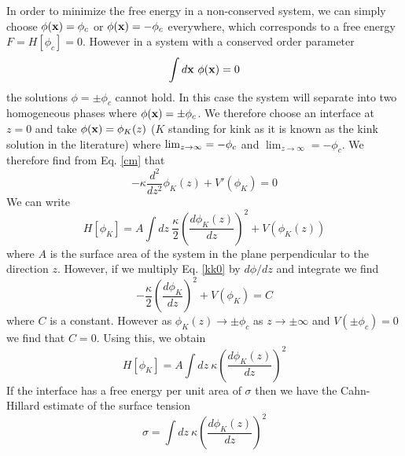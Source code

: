 In order to minimize the free energy in a non-conserved system, we can simply choose $\phi({\bf x}) =\phi_c$ or $\phi({\bf x}) =-\phi_c$ everywhere, which corresponds to a free energy $F=H[\phi_c]=0$. However in a system with a conserved order parameter
\begin{equation}
\int d{\bf x} \ \phi({\bf x})=0
\end{equation}
the solutions $\phi=\pm \phi_c$ cannot hold. In this case the system will separate into two homogeneous phases where $\phi({\bf x})= \pm \phi_c$. We therefore choose an interface at $z=0$ and take $\phi({\bf x}) = \phi_K(z)$ ($K$ standing for kink as it is known as the kink solution in the literature) where $\lim_{z\to\-\infty}=-\phi_c$ and $\lim_{z\to\infty}=-\phi_c$. 
We therefore find from Eq. \eqref{cm} that
\begin{equation}
-\kappa \frac{d^2 }{dz^2}\phi_K(z) + V'(\phi_K) = 0 
\label{kk0}
\end{equation}
We can write
\begin{equation}
H[\phi_K]= A\int dz \ \frac{\kappa}{2}\left(\frac{d\phi_K(z)}{dz}\right)^2 + V(\phi_K(z))
\label{kk1}
\end{equation}
where $A$ is the surface area of the system in the plane perpendicular to the direction $z$. 
However, if we multiply Eq. \eqref{kk0} by $d\phi/dz$ and integrate we find
\begin{equation}
-\frac{\kappa}{2} (\frac{d\phi_K}{dz})^2 + V(\phi_K) = C
\end{equation}
where $C$ is a constant. However as $\phi_K(z)\to \pm \phi_c$ as $z\to \pm \infty$ and $V(\pm\phi_c) =0$ we find that $C=0$. Using this, we obtain 
\begin{equation}
H[\phi_K]= A\int dz\ {\kappa}\left(\frac{d\phi_K(z)}{dz}\right)^2 
\end{equation}
If the interface has a free energy per unit area of $\sigma$ then we have the Cahn-Hillard estimate of the surface tension \cite{cahn_free_1958}
\begin{equation}
\sigma= \int dz\ {\kappa}\left(\frac{d\phi_K(z)}{dz}\right)^2 
\label{CHST}
\end{equation}

